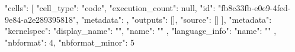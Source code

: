 {
 "cells": [
  {
   "cell_type": "code",
   "execution_count": null,
   "id": "fb8c33fb-e0e9-4fed-9e84-a2e289395818",
   "metadata": {},
   "outputs": [],
   "source": []
  }
 ],
 "metadata": {
  "kernelspec": {
   "display_name": "",
   "name": ""
  },
  "language_info": {
   "name": ""
  }
 },
 "nbformat": 4,
 "nbformat_minor": 5
}
